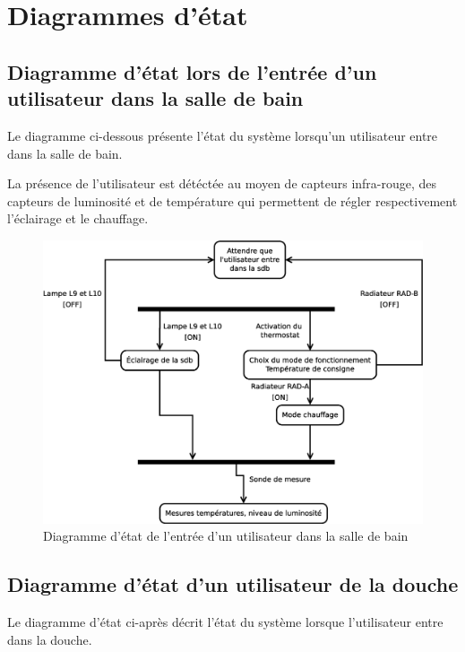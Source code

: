 \chapter{Diagrammes d'état}
\section{Diagramme d'état lors de l'entrée d'un utilisateur dans la salle de bain}
Le diagramme ci-dessous présente l'état du système lorsqu'un utilisateur entre dans la salle de bain.

La présence de l'utilisateur est détéctée au moyen de capteurs infra-rouge, des capteurs de luminosité et de température qui permettent de régler respectivement l'éclairage et le chauffage.
\begin{figure}[H]
	\centering
	\includegraphics[width=1\linewidth]{diagrams/bathroom/diagramme_etat_st.eps}
	\caption{Diagramme d'état de l'entrée d'un utilisateur dans la salle de bain}
	\label{fig:diagramme_st}
\end{figure}
%
\section{Diagramme d'état d'un utilisateur de la douche}
Le diagramme d'état ci-après décrit l'état du système lorsque l'utilisateur entre dans la douche. 

